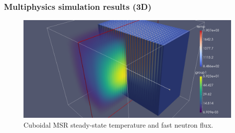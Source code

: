 \begin{frame}
  \frametitle{Multiphysics simulation results (3D)}
  \begin{figure}[t]
   \vspace{-0.1in}
   \hspace*{-0.45in}
   \includegraphics[height=0.75\textheight]{./images/moltres_3D.png}

   \caption{Cuboidal \gls{MSR} steady-state temperature and fast neutron flux.}
    \end{figure}

\end{frame}
